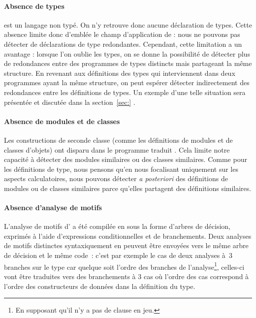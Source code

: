 \paragraph{Absence de types}
{\LambdaCode} est un langage non typé. On n'y retrouve donc aucune
déclaration de types. Cette absence limite donc d'emblée le champ
d'application de {\Asak}: nous ne pouvons pas détecter de déclarations
de type redondantes. Cependant, cette limitation a un avantage :
lorsque l'on oublie les types, on se donne la possibilité de détecter
plus de redondances entre des programmes de types distincts mais
partageant la même structure. En revenant aux définitions des types
qui interviennent dans deux programmes ayant la même structure, on
peut espérer détecter indirectement des redondances entre les
définitions de types.
%
Un exemple d'une telle situation sera présentée
et discutée dans la section~\ref{sec:} .

\paragraph{Absence de modules et de classes}
Les constructions de seconde classe (comme les définitions de modules
et de classes d'objets) ont disparu dans le programme traduit
{\LambdaCode}. Cela limite notre capacité à détecter des modules
similaires ou des classes similaires. Comme pour les définitions de
type, nous pensons qu'en nous focalisant uniquement sur les aspects
calculatoires, nous pouvons détecter \textit{a posteriori} des
définitions de modules ou de classes similaires parce qu'elles
partagent des définitions similaires.

\paragraph{Absence d'analyse de motifs}
L'analyse de motifs d'{\OCaml} a été compilée en {\LambdaCode} sous la
forme d'arbres de décision, exprimés à l'aide d'expressions
conditionnelles et de branchements. Deux analyses de motifs distinctes
syntaxiquement en {\OCaml} peuvent être envoyées vers le même arbre de
décision et le même code~\LambdaCode: c'est par exemple le cas de deux
analyses à~$3$ branches sur le type  car quelque soit l'ordre des branches de
l'analyse\footnote{En supposant qu'il n'y a pas de clause
   en jeu.}, celles-ci vont être traduites vers des
branchements à $3$ cas où l'ordre des cas correspond à l'ordre des
constructeurs de données dans la définition du type.

